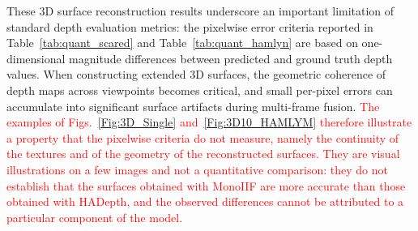 \documentclass[a4paper,fleqn]{cas-dc}
\begin{document}
These 3D surface reconstruction results underscore an important limitation of standard depth evaluation metrics: the pixelwise error criteria reported in Table~\ref{tab:quant_scared} and Table~\ref{tab:quant_hamlyn} are based on one-dimensional magnitude differences between predicted and ground truth depth values. 
When constructing extended 3D surfaces, the geometric coherence of depth maps across viewpoints becomes critical, and small per-pixel errors can accumulate into significant surface artifacts during multi-frame fusion. \textcolor{red}{The examples of Figs.~\ref{Fig:3D_Single} and~\ref{Fig:3D10_HAMLYM} therefore illustrate a property that the pixelwise criteria do not measure, namely the continuity of the textures and of the geometry of the reconstructed surfaces. They are visual illustrations on a few images and not a quantitative comparison: they do not establish that the surfaces obtained with MonoIIF are more accurate than those obtained with HADepth, and the observed differences cannot be attributed to a particular component of the model.}
%
\end{document}
